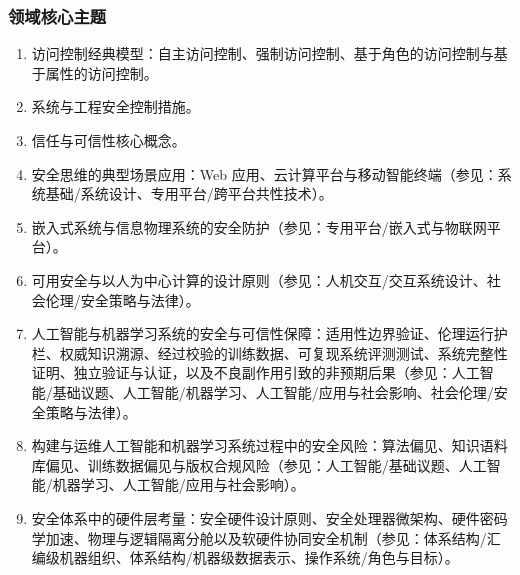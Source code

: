 \subsubsection{领域核心主题}
\begin{enumerate}\setlength{\itemsep}{0pt}\setlength{\parskip}{0pt}\setcounter{enumi}{7}
    \item 访问控制经典模型：自主访问控制、强制访问控制、基于角色的访问控制与基于属性的访问控制。
    \item 系统与工程安全控制措施。
    \item 信任与可信性核心概念。
    \item 安全思维的典型场景应用：Web 应用、云计算平台与移动智能终端（参见：系统基础/系统设计、专用平台/跨平台共性技术）。
    \item 嵌入式系统与信息物理系统的安全防护（参见：专用平台/嵌入式与物联网平台）。
    \item 可用安全与以人为中心计算的设计原则（参见：人机交互/交互系统设计、社会伦理/安全策略与法律）。
    \item 人工智能与机器学习系统的安全与可信性保障：适用性边界验证、伦理运行护栏、权威知识溯源、经过校验的训练数据、可复现系统评测测试、系统完整性证明、独立验证与认证，以及不良副作用引致的非预期后果（参见：人工智能/基础议题、人工智能/机器学习、人工智能/应用与社会影响、社会伦理/安全策略与法律）。
    \item 构建与运维人工智能和机器学习系统过程中的安全风险：算法偏见、知识语料库偏见、训练数据偏见与版权合规风险（参见：人工智能/基础议题、人工智能/机器学习、人工智能/应用与社会影响）。
    \item 安全体系中的硬件层考量：安全硬件设计原则、安全处理器微架构、硬件密码学加速、物理与逻辑隔离分舱以及软硬件协同安全机制（参见：体系结构/汇编级机器组织、体系结构/机器级数据表示、操作系统/角色与目标）。
\end{enumerate}

